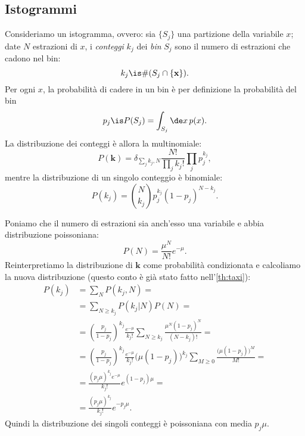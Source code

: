 
\subsection{Istogrammi}
\label{sec:hist}

Consideriamo un istogramma, ovvero:
sia $\{S_j\}$ una partizione della variabile $x$;
date $N$ estrazioni di $x$, i \emph{conteggi} $k_j$ dei \emph{bin} $S_j$
sono il numero di estrazioni che cadono nel bin:
\begin{equation*}
	k_j \is \# (S_j \cap \{\mathbf x\}).
\end{equation*}
Per ogni $x$, la probabilità di cadere in un bin è per definizione la probabilità del bin
\begin{equation*}
	p_j \is P(S_j) = \int_{S_j} \de x\,p(x).
\end{equation*}
La distribuzione dei conteggi è allora la multinomiale:
\begin{equation*}
	P(\mathbf k)
	= \delta_{\sum_jk_j,N} \frac{N!}{\prod_jk_j!}\prod_j p_j^{k_j},
\end{equation*}
mentre la distribuzione di un singolo conteggio è binomiale:
\begin{equation*}
	P(k_j) = \binom N{k_j} p_j^{k_j} (1-p_j)^{N-k_j}.
\end{equation*}

Poniamo che il numero di estrazioni sia anch'esso una variabile e abbia distribuzione poissoniana:
\begin{equation*}
	P(N)
	= \frac{\mu^N}{N!}e^{-\mu}.
\end{equation*}
Reinterpretiamo la distribuzione di $\mathbf k$ come probabilità condizionata e calcoliamo la nuova distribuzione (questo conto è già stato fatto nell'\autoref{th:taxi}):
\begin{align*}
	P(k_j)
	&= \sum_N P(k_j,N) = \\
	&= \sum_{N\ge k_j} P(k_j|N) P(N) = \\
	&= \left(\frac{p_j}{1-p_j}\right)^{k_j} \frac{e^{-\mu}}{k_j!}
	\sum_{N\ge k_j} \frac{\mu^N (1-p_j)^N}{(N-k_j)!} = \\
	&= \left(\frac{p_j}{1-p_j}\right)^{k_j} \frac{e^{-\mu}}{k_j!}
	\big(\mu(1-p_j)\big)^{k_j} \sum_{M\ge 0} \frac{\big(\mu(1-p_j)\big)^M}{M!} = \\
	&= \frac{(p_j\mu)^{k_j} e^{-\mu}}{k_j!} e^{(1-p_j)\mu} = \\
	&= \frac{(p_j\mu)^{k_j}}{k_j!} e^{-p_j\mu}.
\end{align*}
Quindi la distribuzione dei singoli conteggi è poissoniana con media $p_j\mu$.

